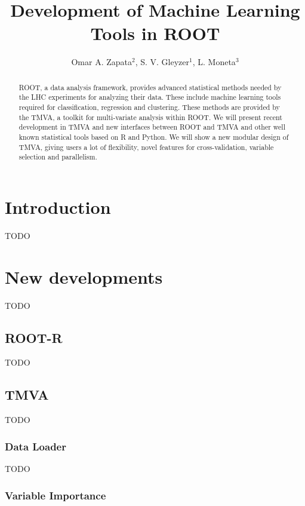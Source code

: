 \documentclass[a4paper]{jpconf}
\begin{document}
\title{Development of Machine Learning Tools in ROOT}

\author{Omar A. Zapata$^2$, S. V. Gleyzer$^1$, L. Moneta$^3$}

\address{$^1$,University of Antioquia and Metropolitan Institute of Technology, Street 67 No. 53 - 108 Medellin Colombia}
\address{$^2$,University of Florida and CERN, PH Dep. CH-1211 Geneva 23}
\address{$^3$,CERN PH Dep. CH-1211 Geneva 23}


\begin{abstract}
ROOT, a data analysis framework, provides advanced statistical methods needed by the LHC experiments for analyzing their data. These include machine learning tools required for classification, regression and clustering. These methods are provided by the TMVA, a toolkit for multi-variate analysis within ROOT. We will present recent development in TMVA and new interfaces between ROOT and TMVA and other well known statistical tools based on R and Python.
We will show a new modular design of TMVA, giving users a lot of flexibility, novel features for cross-validation, variable selection and parallelism.
\end{abstract}

\section{Introduction}
TODO

\section{New developments}
TODO
\subsection{ROOT-R}
TODO

\subsection{TMVA}
TODO

\subsubsection{Data Loader}

TODO

\subsubsection{Variable Importance}
\end{document}
